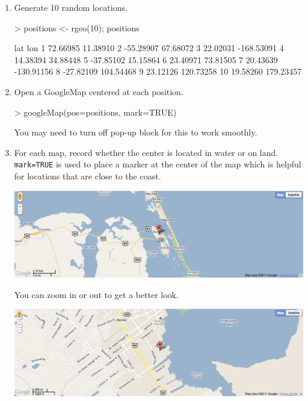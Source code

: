 \begin{enumerate}
\item Generate 10 random locations.

\begin{Schunk}
\begin{Sinput}
> positions <- rgeo(10); positions
\end{Sinput}
\begin{Soutput}
         lat        lon
1   72.66985   11.38910
2  -55.28907   67.68072
3   22.02031 -168.53091
4   14.38394   34.88448
5  -37.85102   15.15864
6   23.40971   73.81505
7   20.43639 -130.91156
8  -27.82109  104.54468
9   23.12126  120.73258
10  19.58260  179.23457
\end{Soutput}
\end{Schunk}

\item
Open a GoogleMap centered at each position.

\begin{Schunk}
\begin{Sinput}
> googleMap(pos=positions, mark=TRUE)
\end{Sinput}
\end{Schunk}
You may need to turn off pop-up block for this to work smoothly.

\item
For each map, record whether the center is located in water or on land.  \verb!mark=TRUE!
is used to place a marker at the center of the map which is helpful for locations that are close to 
the coast.  
\begin{center}
\includegraphics[width=.8\textwidth]{images/google-water1}
\end{center}
You can zoom in or out to get a better look.
\begin{center}
\includegraphics[width=.8\textwidth]{images/google-water2}
\end{center}



\end{enumerate}
